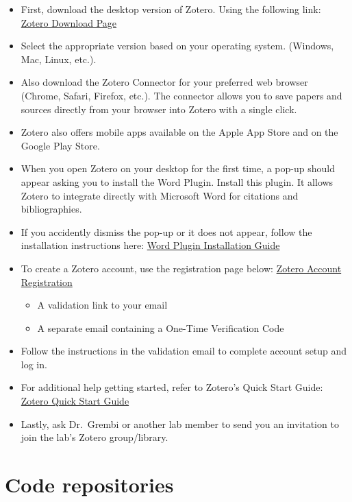 \documentclass[
]{book}
\providecommand{\tightlist}{%
  \setlength{\itemsep}{0pt}\setlength{\parskip}{0pt}}
\begin{document}
\begin{itemize}
\tightlist
\item
  First, download the desktop version of Zotero. Using the following link: \href{https://www.zotero.org/download/}{Zotero Download Page}
\item
  Select the appropriate version based on your operating system. (Windows, Mac, Linux, etc.).
\item
  Also download the Zotero Connector for your preferred web browser (Chrome, Safari, Firefox, etc.). The connector allows you to save papers and sources directly from your browser into Zotero with a single click.
\item
  Zotero also offers mobile apps available on the Apple App Store and on the Google Play Store.
\item
  When you open Zotero on your desktop for the first time, a pop-up should appear asking you to install the Word Plugin. Install this plugin. It allows Zotero to integrate directly with Microsoft Word for citations and bibliographies.
\item
  If you accidently dismiss the pop-up or it does not appear, follow the installation instructions here: \href{https://www.zotero.org/support/word_processor_plugin_installation}{Word Plugin Installation Guide}
\item
  To create a Zotero account, use the registration page below: \href{https://www.zotero.org/user/register/}{Zotero Account Registration}

  \begin{itemize}
  \tightlist
  \item
    A validation link to your email
  \item
    A separate email containing a One-Time Verification Code
  \end{itemize}
\item
  Follow the instructions in the validation email to complete account setup and log in.
\item
  For additional help getting started, refer to Zotero's Quick Start Guide: \href{https://www.zotero.org/support/quick_start_guide}{Zotero Quick Start Guide}
\item
  Lastly, ask Dr.~Grembi or another lab member to send you an invitation to join the lab's Zotero group/library.
\end{itemize}

\chapter{Code repositories}\label{code-repositories}
\end{document}

